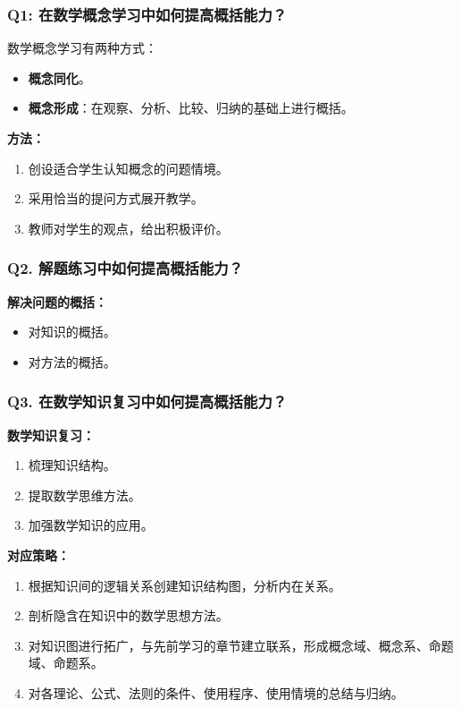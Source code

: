 \begin{multicols}{2}
    


\subsubsection*{Q1: 在数学概念学习中如何提高概括能力？}

数学概念学习有两种方式：
\begin{itemize}
    \item \textbf{概念同化}。
    \item \textbf{概念形成}：在观察、分析、比较、归纳的基础上进行概括。
\end{itemize}

\textbf{方法：}
\begin{enumerate}
    \item 创设适合学生认知概念的问题情境。
    \item 采用恰当的提问方式展开教学。
    \item 教师对学生的观点，给出积极评价。
\end{enumerate}

\subsubsection*{Q2. 解题练习中如何提高概括能力？}

\textbf{解决问题的概括：}
\begin{itemize}
    \item 对知识的概括。
    \item 对方法的概括。
\end{itemize}

\columnbreak

\subsubsection*{Q3. 在数学知识复习中如何提高概括能力？}
\textbf{数学知识复习：}
\begin{enumerate}
    \item 梳理知识结构。
    \item 提取数学思维方法。
    \item 加强数学知识的应用。
\end{enumerate}

\textbf{对应策略：}
\begin{enumerate}
    \item 根据知识间的逻辑关系创建知识结构图，分析内在关系。
    \item 剖析隐含在知识中的数学思想方法。
    \item 对知识图进行拓广，与先前学习的章节建立联系，形成概念域、概念系、命题域、命题系。
    \item 对各理论、公式、法则的条件、使用程序、使用情境的总结与归纳。
\end{enumerate}

\end{multicols}

